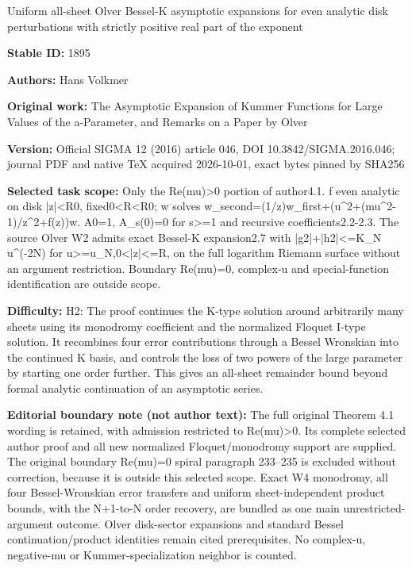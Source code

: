 \documentclass[11pt]{article}
\numberwithin{equation}{section}
\begin{document}
\begin{center}\Large Uniform all-sheet Olver Bessel-K asymptotic expansions for even analytic disk perturbations with strictly positive real part of the exponent\end{center}
\noindent\textbf{Stable ID:} 1895\par
\noindent\textbf{Authors:} Hans Volkmer\par
\noindent\textbf{Original work:} The Asymptotic Expansion of Kummer Functions for Large Values of the a-Parameter, and Remarks on a Paper by Olver\par
\noindent\textbf{Version:} Official SIGMA 12 (2016) article 046, DOI 10.3842/SIGMA.2016.046; journal PDF and native TeX acquired 2026-10-01, exact bytes pinned by SHA256\par
\noindent\textbf{Selected task scope:} Only the Re(mu)>0 portion of author4.1. f even analytic on disk |z|<R0, fixed0<R<R0; w solves w\_second=\allowbreak{}(1/z)w\_first+\allowbreak{}(u\textasciicircum{}2+\allowbreak{}(mu\textasciicircum{}2-1)/z\textasciicircum{}2+\allowbreak{}f(z))w. A0=\allowbreak{}1, A\_s(0)=\allowbreak{}0 for s>=\allowbreak{}1 and recursive coefficients2.2-2.3. The source Olver W2 admits exact Bessel-K expansion2.7 with |g2|+\allowbreak{}|h2|<=\allowbreak{}K\_N u\textasciicircum{}(-2N) for u>=\allowbreak{}u\_N,0<|z|<=\allowbreak{}R, on the full logarithm Riemann surface without an argument restriction. Boundary Re(mu)=\allowbreak{}0, complex-u and special-function identification are outside scope.\par
\noindent\textbf{Difficulty:} H2: The proof continues the K-type solution around arbitrarily many sheets using its monodromy coefficient and the normalized Floquet I-type solution. It recombines four error contributions through a Bessel Wronskian into the continued K basis, and controls the loss of two powers of the large parameter by starting one order further. This gives an all-sheet remainder bound beyond formal analytic continuation of an asymptotic series.\par
\noindent\textbf{Editorial boundary note (not author text):} The full original Theorem 4.1 wording is retained, with admission restricted to Re(mu)>0. Its complete selected author proof and all new normalized Floquet/monodromy support are supplied. The original boundary Re(mu)=\allowbreak{}0 spiral paragraph 233–235 is excluded without correction, because it is outside this selected scope. Exact W4 monodromy, all four Bessel-Wronskian error transfers and uniform sheet-independent product bounds, with the N+\allowbreak{}1-to-N order recovery, are bundled as one main unrestricted-argument outcome. Olver disk-sector expansions and standard Bessel continuation/product identities remain cited prerequisites. No complex-u, negative-mu or Kummer-specialization neighbor is counted.\par
\end{document}
